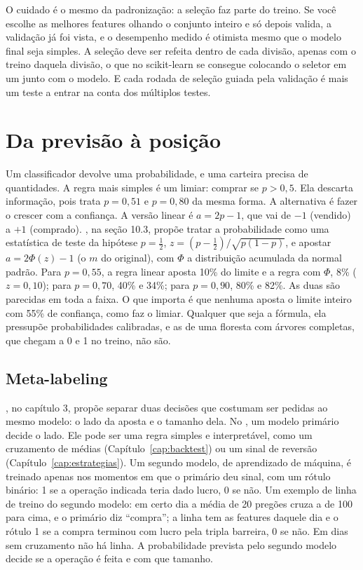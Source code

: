 O cuidado é o mesmo da padronização: a seleção faz parte do treino. Se você escolhe as melhores features olhando o conjunto inteiro e só depois valida, a validação já foi vista, e o desempenho medido é otimista mesmo que o modelo final seja simples. A seleção deve ser refeita dentro de cada divisão, apenas com o treino daquela divisão, o que no scikit-learn se consegue colocando o seletor em um  junto com o modelo. E cada rodada de seleção guiada pela validação é mais um teste a entrar na conta dos múltiplos testes.

\section{Da previsão à posição}
\label{sec:c13-posicao}

Um classificador devolve uma probabilidade, e uma carteira precisa de quantidades. A regra mais simples é um limiar: comprar se $p > 0,5$. Ela descarta informação, pois trata $p = 0,51$ e $p = 0,80$ da mesma forma. A alternativa é fazer o  crescer com a confiança. A versão linear é $a = 2p - 1$, que vai de $-1$ (vendido) a $+1$ (comprado). \citet{lopezdeprado2018}, na seção 10.3, propõe tratar a probabilidade como uma estatística de teste da hipótese $p = \tfrac{1}{2}$, $z = (p - \tfrac{1}{2})/\sqrt{p(1-p)}$, e apostar $a = 2\Phi(z) - 1$ (o $m$ do original), com $\Phi$ a distribuição acumulada da normal padrão. Para $p = 0,55$, a regra linear aposta 10\% do limite e a regra com $\Phi$, 8\% ($z = 0,10$); para $p = 0,70$, 40\% e 34\%; para $p = 0,90$, 80\% e 82\%. As duas são parecidas em toda a faixa. O que importa é que nenhuma aposta o limite inteiro com 55\% de confiança, como faz o limiar. Qualquer que seja a fórmula, ela pressupõe probabilidades calibradas, e as de uma floresta com árvores completas, que chegam a 0 e 1 no treino, não são.

\subsection{Meta-labeling}

\citet{lopezdeprado2018}, no capítulo 3, propõe separar duas decisões que costumam ser pedidas ao mesmo modelo: o lado da aposta e o tamanho dela. No , um modelo primário decide o lado. Ele pode ser uma regra simples e interpretável, como um cruzamento de médias (Capítulo~\ref{cap:backtest}) ou um sinal de reversão (Capítulo~\ref{cap:estrategias}). Um segundo modelo, de aprendizado de máquina, é treinado apenas nos momentos em que o primário deu sinal, com um rótulo binário: 1 se a operação indicada teria dado lucro, 0 se não. Um exemplo de linha de treino do segundo modelo: em certo dia a média de 20 pregões cruza a de 100 para cima, e o primário diz ``compra''; a linha tem as features daquele dia e o rótulo 1 se a compra terminou com lucro pela tripla barreira, 0 se não. Em dias sem cruzamento não há linha. A probabilidade prevista pelo segundo modelo decide se a operação é feita e com que tamanho.

